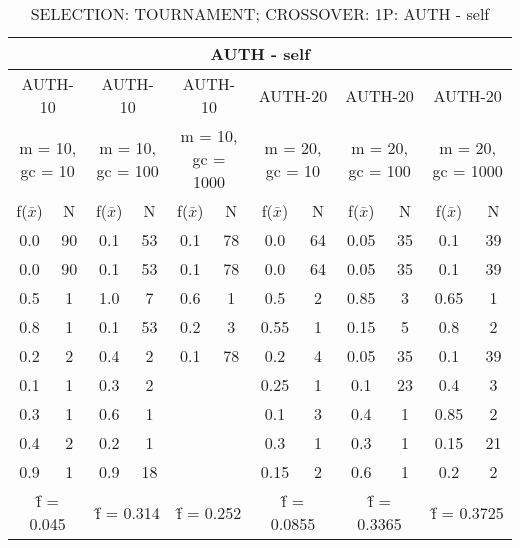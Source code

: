 \begin{table}[H]
	\centering
	\caption{SELECTION: TOURNAMENT; CROSSOVER: 1P: AUTH - self}
	\begin{adjustbox}{width=1\textwidth}
		\begin{tabular}{ |c|c||c|c||c|c||c|c||c|c||c|c| }
			\hline
			\multicolumn{12}{|c|}{AUTH - self} \\
			\hline
			\multicolumn{2}{|c||}{AUTH-10} & \multicolumn{2}{c||}{AUTH-10} & \multicolumn{2}{c||}{AUTH-10} & \multicolumn{2}{c||}{AUTH-20} & \multicolumn{2}{c||}{AUTH-20} & \multicolumn{2}{c|}{AUTH-20}\\
			\hline
			\multicolumn{2}{|c||}{m = 10, gc = 10} & \multicolumn{2}{c||}{m = 10, gc = 100} & \multicolumn{2}{c||}{m = 10, gc = 1000} & \multicolumn{2}{c||}{m = 20, gc = 10} & \multicolumn{2}{c||}{m = 20, gc = 100} & \multicolumn{2}{c|}{m = 20, gc = 1000}\\
			\hline
			f($\bar{x}$) & N & f($\bar{x}$) & N & f($\bar{x}$) & N & f($\bar{x}$) & N & f($\bar{x}$) & N & f($\bar{x}$) & N\\
			\hline
			\hline
			0.0 & 90 & 0.1 & 53 & 0.1 & 78 & 0.0 & 64 & 0.05 & 35 & 0.1 & 39\\
			\hline
			0.0 & 90 & 0.1 & 53 & 0.1 & 78 & 0.0 & 64 & 0.05 & 35 & 0.1 & 39\\
			0.5 & 1 & 1.0 & 7 & 0.6 & 1 & 0.5 & 2 & 0.85 & 3 & 0.65 & 1\\
			0.8 & 1 & 0.1 & 53 & 0.2 & 3 & 0.55 & 1 & 0.15 & 5 & 0.8 & 2\\
			0.2 & 2 & 0.4 & 2 & 0.1 & 78 & 0.2 & 4 & 0.05 & 35 & 0.1 & 39\\
			0.1 & 1 & 0.3 & 2 &   &   & 0.25 & 1 & 0.1 & 23 & 0.4 & 3\\
			0.3 & 1 & 0.6 & 1 &   &   & 0.1 & 3 & 0.4 & 1 & 0.85 & 2\\
			0.4 & 2 & 0.2 & 1 &   &   & 0.3 & 1 & 0.3 & 1 & 0.15 & 21\\
			0.9 & 1 & 0.9 & 18 &   &   & 0.15 & 2 & 0.6 & 1 & 0.2 & 2\\
			\hline
			\multicolumn{2}{|c||}{\^{f} = 0.045} & \multicolumn{2}{c||}{\^{f} = 0.314} & \multicolumn{2}{c||}{\^{f} = 0.252} & \multicolumn{2}{c||}{\^{f} = 0.0855} & \multicolumn{2}{c||}{\^{f} = 0.3365} & \multicolumn{2}{c|}{\^{f} = 0.3725}\\
			\hline
		\end{tabular}
	\end{adjustbox}
\end{table}
